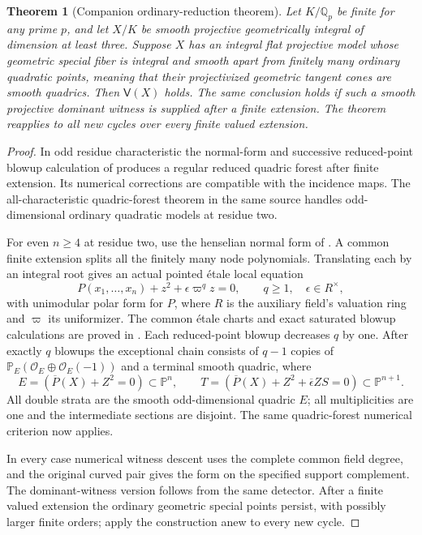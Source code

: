 \documentclass[11pt,a4paper]{article}
\newtheorem{theorem}{Theorem}[section]
\theoremstyle{definition}
\theoremstyle{remark}\newtheorem{remark}[theorem]{Remark}
\numberwithin{equation}{section}
\newcommand{\Q}{\mathbb Q}\newcommand{\R}{\mathbb R}\newcommand{\C}{\mathbb C}
\newcommand{\PP}{\mathbb P}\newcommand{\LL}{\mathbb L}
\begin{document}
\begin{theorem}[Companion ordinary-reduction theorem]\label{thm:ordinary}
Let $K/\Q_p$ be finite for any prime $p$, and let $X/K$ be smooth
projective geometrically integral of dimension at least three.
Suppose $X$ has an integral flat projective model whose geometric
special fiber is integral and smooth apart from finitely many
ordinary quadratic points, meaning that their projectivized
geometric tangent cones are smooth quadrics. Then $\mathsf V(X)$ holds. The same
conclusion holds if such a smooth projective dominant witness is
supplied after a finite extension. The theorem reapplies to all
new cycles over every finite valued extension.
\end{theorem}

\begin{proof}
In odd residue characteristic the normal-form and successive
reduced-point blowup calculation of \cite{InternalOrdinary}
produces a regular reduced quadric forest after finite extension.
Its numerical corrections are compatible with the incidence maps.
The all-characteristic quadric-forest theorem in the same source
handles odd-dimensional ordinary quadratic models at residue two.

For even $n\geq4$ at residue two, use the henselian normal form of
\cite[Lemma 4(ii)]{JannsenSaito}. A common finite extension splits
all the finitely many node polynomials. Translating each by an
integral root gives an actual pointed \'etale local equation
\[
 P(x_1,\ldots,x_n)+z^2+\epsilon\varpi^qz=0,
 \qquad q\geq1,\quad\epsilon\in R^\times,
\]
with unimodular polar form for $P$, where $R$ is the auxiliary
field's valuation ring and $\varpi$ its uniformizer. The common \'etale charts and
exact saturated blowup calculations are proved in
\cite[common \'etale neighborhoods and native degenerate-node chains]
{InternalOrdinary}. Each reduced-point blowup decreases $q$ by
one. After exactly $q$ blowups the exceptional chain consists of
$q-1$ copies of
$\PP_E(\mathcal O_E\oplus\mathcal O_E(-1))$ and a terminal
smooth quadric, where
\[
 E=(\overline P(X)+Z^2=0)\subset\PP^n,
 \qquad
 T=(\overline P(X)+Z^2+\overline\epsilon ZS=0)
       \subset\PP^{n+1}.
\]
All double strata are the smooth odd-dimensional quadric $E$;
all multiplicities are one and the intermediate sections are
disjoint. The same quadric-forest numerical criterion now applies.

In every case numerical witness descent uses the complete common
field degree, and the original curved pair gives the form on the
specified support complement. The dominant-witness version follows
from the same detector. After a finite valued extension the ordinary
geometric special points persist, with possibly larger finite
orders; apply the construction anew to every new cycle.
\end{proof}
\end{document}
